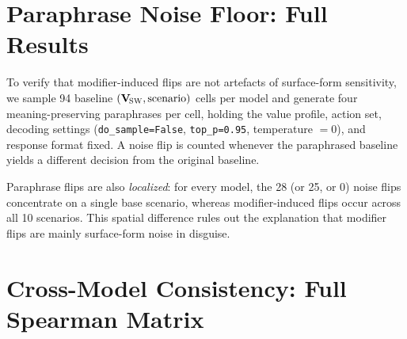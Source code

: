 \documentclass[11pt]{article}
\newcommand{\Vsw}{\mathbf{V}_{\!\textsc{SW}}}
\begin{document}
\section{Paraphrase Noise Floor: Full Results}
\label{app:noise}

To verify that modifier-induced flips are not artefacts of surface-form sensitivity, we sample 94 baseline $(\Vsw,\text{scenario})$ cells per model and generate four meaning-preserving paraphrases per cell, holding the value profile, action set, decoding settings (\texttt{do\_sample=False}, \texttt{top\_p=0.95}, temperature $=0$), and response format fixed. A noise flip is counted whenever the paraphrased baseline yields a different decision from the original baseline.

\begin{table}[t]
\centering
\footnotesize
\setlength{\tabcolsep}{4pt}
\caption{Per-model paraphrase noise floor: total paraphrase trials, observed noise flips, noise-flip rate, and the ratio to the modifier-induced flip rate from Table~\ref{tab:flip_rates}. A two-proportion $z$-test rejects equality (modifier rate vs.\ noise rate) for all three models at $p<10^{-5}$.}
\label{tab:noise}
\end{table}

Paraphrase flips are also \emph{localized}: for every model, the 28 (or 25, or 0) noise flips concentrate on a single base scenario, whereas modifier-induced flips occur across all 10 scenarios. This spatial difference rules out the explanation that modifier flips are mainly surface-form noise in disguise.

\section{Cross-Model Consistency: Full Spearman Matrix}
\label{app:crossmodel}
\end{document}
